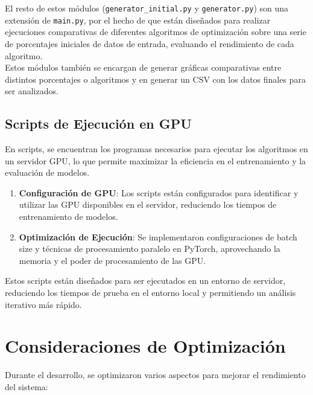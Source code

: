 El resto de estos módulos (\texttt{generator\_initial.py} y \texttt{generator.py}) son una extensión de
\texttt{main.py}, por el hecho de que están diseñados para realizar ejecuciones comparativas de diferentes algoritmos
de optimización sobre una serie de porcentajes iniciales de datos de entrada, evaluando el rendimiento de cada
algoritmo. \\[6pt]

Estos módulos también se encargan de generar gráficas comparativas entre distintos porcentajes o algoritmos y en
generar un CSV con los datos finales para ser analizados.

\subsection{Scripts de Ejecución en GPU}\label{subsec:scripts-de-ejecucion-en-gpu}
En scripts, se encuentran los programas necesarios para ejecutar los algoritmos en un servidor GPU, lo que permite
maximizar la eficiencia en el entrenamiento y la evaluación de modelos.
\begin{enumerate}
    \item \textbf{Configuración de GPU}: Los scripts están configurados para identificar y utilizar las GPU disponibles
          en el servidor, reduciendo los tiempos de entrenamiento de modelos.
    \item \textbf{Optimización de Ejecución}: Se implementaron configuraciones de batch size y técnicas de
          procesamiento paralelo en PyTorch, aprovechando la memoria y el poder de procesamiento de las GPU\@.
\end{enumerate}

Estos scripts están diseñados para ser ejecutados en un entorno de servidor, reduciendo los tiempos de prueba en el
entorno local y permitiendo un análisis iterativo más rápido.

\section{Consideraciones de Optimización}\label{sec:consideraciones-de-optimizacion}
Durante el desarrollo, se optimizaron varios aspectos para mejorar el rendimiento del sistema:

